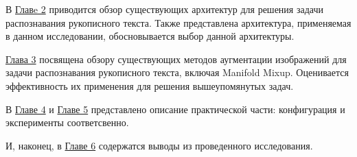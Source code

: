 В \hyperref[sec:Chapter1]{Главe 2} приводится обзор существующих архитектур для решения задачи распознавания рукописного текста. Также представлена архитектура, применяемая в данном исследовании, обосновывается выбор данной архитектуры.


\hyperref[sec:Chapter2]{Глава 3} посвящена обзору существующих методов аугментации изображений для задачи распознавания рукописного текста, включая Manifold Mixup. Оценивается эффективность их применения для решения вышеупомянутых задач.

В \hyperref[sec:Chapter3]{Главе 4} и \hyperref[sec:Chapter4]{Главе 5} представлено описание практической части: конфигурация и эксперименты соответсвенно.

И, наконец, в \hyperref[sec:Chapter5]{Главе 6} содержатся выводы из проведенного исследования.

\newpage
